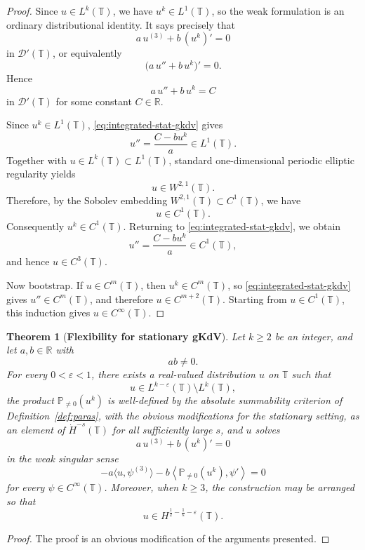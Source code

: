 \documentclass[12pt,reqno,letterpaper]{amsart}
\numberwithin{equation}{section}
\newcommand{\1}{{\bf 1}}
\newcommand{\2}{{\bf 2}}
\newcommand{\T}{\mathbb T}
\newtheorem{theorem}{Theorem}[section]
\theoremstyle{remark}
\theoremstyle{remark}
\begin{document}
\begin{proof}
Since $u\in L^k(\T)$, we have $u^k\in L^1(\T)$, so the weak formulation is
an ordinary distributional identity. It says precisely that
\[
a\,u^{(3)}+b\,(u^k)'=0
\]
in $\mathcal D'(\T)$, or equivalently
\[
\bigl(a\,u''+b\,u^k\bigr)'=0 .
\]
Hence
\begin{equation}\label{eq:integrated-stat-gkdv}
    a\,u''+b\,u^k=C
\end{equation}
in $\mathcal D'(\T)$ for some constant $C\in\mathbb R$.

Since $u^k\in L^1(\T)$, \eqref{eq:integrated-stat-gkdv} gives
\[
u''=\frac{C-bu^k}{a}\in L^1(\T).
\]
Together with $u\in L^k(\T)\subset L^1(\T)$, standard one-dimensional
periodic elliptic regularity yields
\[
u\in W^{2,1}(\T).
\]
Therefore, by the Sobolev embedding $W^{2,1}(\T)\subset C^1(\T)$, we have
\[
u\in C^1(\T).
\]
Consequently $u^k\in C^1(\T)$. Returning to
\eqref{eq:integrated-stat-gkdv}, we obtain
\[
u''=\frac{C-bu^k}{a}\in C^1(\T),
\]
and hence $u\in C^3(\T)$.

Now bootstrap. If $u\in C^m(\T)$, then $u^k\in C^m(\T)$, so
\eqref{eq:integrated-stat-gkdv} gives $u''\in C^m(\T)$, and therefore
$u\in C^{m+2}(\T)$. Starting from $u\in C^1(\T)$, this induction gives $ u\in C^{\infty}(\T)$.
\end{proof}

\begin{theorem}[\textbf{Flexibility for stationary \textsf{gKdV}}]\label{thm:stat-gkdv-flex}
Let $k\geq2$ be an integer, and let $a,b\in\mathbb R$ with
\[
ab\neq0.
\]
For every $0<\varepsilon<1$, there exists a real-valued distribution $u$ on
$\T$ such that
\[
u\in L^{k-\varepsilon}(\T)\setminus L^k(\T),
\]
the product $\mathbb P_{\neq0}(u^k)$ is well-defined by the absolute
summability criterion of Definition~\ref{def:paras}, with the obvious modifications for the stationary setting, as an element of
$\dot H^{-s}(\T)$ for all sufficiently large $s$, and $u$ solves
\[
a\,u^{(3)}+b\,(u^k)'=0
\]
in the weak singular sense
\begin{equation*}
    -a\langle u,\psi^{(3)}\rangle
    -
    b\left\langle
        \mathbb P_{\neq0}(u^k),\psi'
    \right\rangle
    =
    0
\end{equation*}
for every $\psi\in C^\infty(\T)$. Moreover, when $k\geq3$, the construction
may be arranged so that
\[
u\in H^{\frac12-\frac1k-\varepsilon}(\T).
\]
\end{theorem}
\begin{proof}
    The proof is an obvious modification of the arguments presented.
\end{proof}
\end{document}
